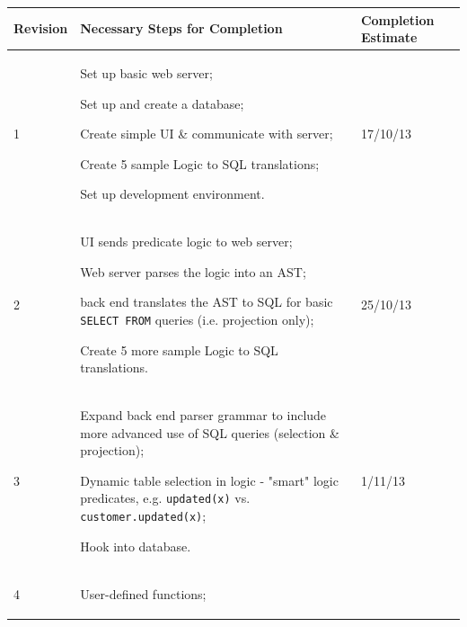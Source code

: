 \documentclass[a4paper, 11pt]{article}
\begin{document}
    \begin{table}[H]
      \centering
      \begin{tabular}{| l | p{} | l |}
        \hline
        \textbf{Revision} & \textbf{Necessary Steps for Completion}
          & \textbf{Completion Estimate} \\
        \hline
        1 &
          \begin{compactitem}
            \item Set up basic web server;
            \item Set up and create a database;
            \item Create simple UI \& communicate with server;
            \item Create 5 sample Logic to SQL translations;
            \item Set up development environment.
          \end{compactitem}
          & 17/10/13 \\
        \hline
        2 &
          \begin{compactitem}
            \item UI sends predicate logic to web server;
            \item Web server parses the logic into an AST;
            \item back end translates the AST to SQL for basic \texttt{SELECT
              FROM} queries (i.e. projection only);
            \item Create 5 more sample Logic to SQL translations.
          \end{compactitem}
          & 25/10/13 \\
        \hline
        3 &
          \begin{compactitem}
            \item Expand back end parser grammar to include more advanced use of
              SQL queries (selection \& projection);
            \item Dynamic table selection in logic - "smart" logic predicates,
              e.g. \texttt{updated(x)} vs. \texttt{customer.updated(x)};
            \item Hook into database.
          \end{compactitem}
          & 1/11/13 \\
        \hline
        4 &
          \begin{compactitem}
            \item User-defined functions;

\end{compactitem}
\end{tabular}
\end{table}
\end{document}
